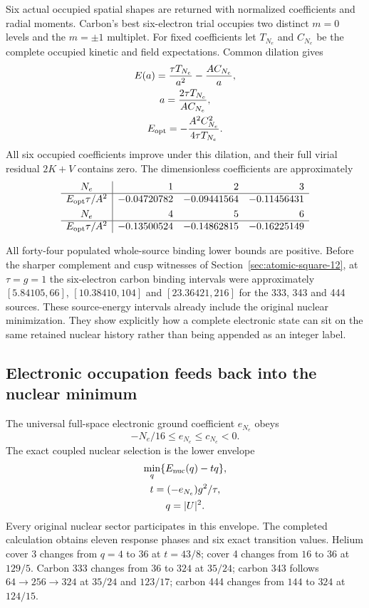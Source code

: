 Six actual occupied spatial shapes are returned with normalized coefficients and radial moments. Carbon's best six-electron trial occupies two distinct $m=0$ levels and the $m=\pm1$ multiplet. For fixed coefficients let $T_{N_e}$ and $C_{N_e}$ be the complete occupied kinetic and field expectations. Common dilation gives
\[
\begin{gathered}
E(a)=\frac{\tau T_{N_e}}{a^2}-\frac{A C_{N_e}}a,
 \\
 a=\frac{2\tau T_{N_e}}{A C_{N_e}},
 \\
 E_{\rm opt}=-\frac{A^2 C_{N_e}^2}{4\tau T_{N_e}}.
\end{gathered}
\]
All six occupied coefficients improve under this dilation, and their full virial residual $2K+V$ contains zero. The dimensionless coefficients are approximately
\[
\begin{array}{c|rrr}
 N_e&1&2&3\\\hline
 E_{\rm opt}\tau/A^2&-0.04720782&-0.09441564&-0.11456431\\[3pt]
 N_e&4&5&6\\\hline
 E_{\rm opt}\tau/A^2&-0.13500524&-0.14862815&-0.16225149
\end{array}
\]

All forty-four populated whole-source binding lower bounds are positive. Before the sharper complement and cusp witnesses of Section~\ref{sec:atomic-square-12}, at $\tau=g=1$ the six-electron carbon binding intervals were approximately $[5.84105,66]$, $[10.38410,104]$ and $[23.36421,216]$ for the 333, 343 and 444 sources. These source-energy intervals already include the original nuclear minimization. They show explicitly how a complete electronic state can sit on the same retained nuclear history rather than being appended as an integer label.

\subsection{Electronic occupation feeds back into the nuclear minimum}

The universal full-space electronic ground coefficient $e_{N_e}$ obeys
\[
 -N_e/16\leq e_{N_e}\leq c_{N_e}<0.
\]
The exact coupled nuclear selection is the lower envelope
\[
\begin{gathered}
\min_q\{E_{\rm nuc}(q)-tq\},\\
 t=(-e_{N_e})g^2/\tau,\\
 q=|U|^2.
\end{gathered}
\]
Every original nuclear sector participates in this envelope. The completed calculation obtains eleven response phases and six exact transition values. Helium cover 3 changes from $q=4$ to $36$ at $t=43/8$; cover 4 changes from $16$ to $36$ at $129/5$. Carbon 333 changes from $36$ to $324$ at $35/24$; carbon 343 follows $64\to256\to324$ at $35/24$ and $123/17$; carbon 444 changes from $144$ to $324$ at $124/15$. 

